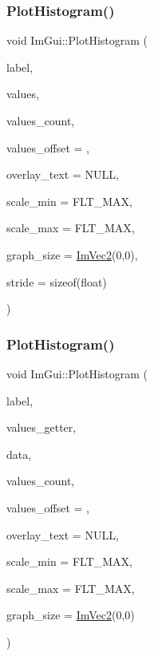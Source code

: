 \subsubsection{\texorpdfstring{Plot\+Histogram()}{PlotHistogram()}\hspace{0.1cm}{\footnotesize\ttfamily [1/2]}}
{\footnotesize\ttfamily void Im\+Gui\+::\+Plot\+Histogram (\begin{DoxyParamCaption}\item[{const char $\ast$}]{label,  }\item[{const float $\ast$}]{values,  }\item[{int}]{values\+\_\+count,  }\item[{int}]{values\+\_\+offset = {},  }\item[{const char $\ast$}]{overlay\+\_\+text = {\ttfamily NULL},  }\item[{float}]{scale\+\_\+min = {\ttfamily FLT\+\_\+MAX},  }\item[{float}]{scale\+\_\+max = {\ttfamily FLT\+\_\+MAX},  }\item[{\mbox{\hyperlink{struct_im_vec2}{Im\+Vec2}}}]{graph\+\_\+size = {\ttfamily \mbox{\hyperlink{struct_im_vec2}{Im\+Vec2}}(0,0)},  }\item[{int}]{stride = {\ttfamily sizeof(float)} }\end{DoxyParamCaption})}

\mbox{\label{namespace_im_gui_af8089203baf8cf723a158c9e34bda2a4}} 
\subsubsection{\texorpdfstring{Plot\+Histogram()}{PlotHistogram()}\hspace{0.1cm}{\footnotesize\ttfamily [2/2]}}
{\footnotesize\ttfamily void Im\+Gui\+::\+Plot\+Histogram (\begin{DoxyParamCaption}\item[{const char $\ast$}]{label,  }\item[{float($\ast$)(void $\ast$data, int idx)}]{values\+\_\+getter,  }\item[{void $\ast$}]{data,  }\item[{int}]{values\+\_\+count,  }\item[{int}]{values\+\_\+offset = {},  }\item[{const char $\ast$}]{overlay\+\_\+text = {\ttfamily NULL},  }\item[{float}]{scale\+\_\+min = {\ttfamily FLT\+\_\+MAX},  }\item[{float}]{scale\+\_\+max = {\ttfamily FLT\+\_\+MAX},  }\item[{\mbox{\hyperlink{struct_im_vec2}{Im\+Vec2}}}]{graph\+\_\+size = {\ttfamily \mbox{\hyperlink{struct_im_vec2}{Im\+Vec2}}(0,0)} }\end{DoxyParamCaption})}

